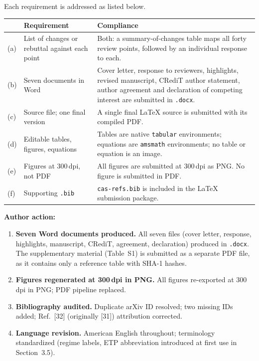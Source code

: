 \documentclass[11pt,a4paper]{article}
\newcommand{\arhead}[1]{\medskip\noindent\textbf{#1}\par\smallskip}
\begin{document}
Each requirement is addressed as listed below.

\renewcommand{\arraystretch}{1.2}
\begin{tabular}{@{}L{0.5cm}L{6.0cm}L{7.6cm}@{}}
\toprule
{} & \textbf{Requirement} & \textbf{Compliance} \\
\midrule
(a) & List of changes or rebuttal against each point &
Both: a summary-of-changes table maps all forty review points, followed
by an individual response to each. \\
(b) & Seven documents in Word &
Cover letter, response to reviewers, highlights, revised manuscript,
CRediT author statement, author agreement and declaration of competing
interest are submitted in \texttt{.docx}. \\
(c) & Source file; one final version &
A single final \LaTeX{} source is submitted with its compiled PDF. \\
(d) & Editable tables, figures, equations &
Tables are native \texttt{tabular} environments; equations are
\texttt{amsmath} environments; no table or equation is an image. \\
(e) & Figures at 300\,dpi, not PDF &
All figures are submitted at 300\,dpi as PNG. No figure is
submitted in PDF. \\
(f) & Supporting \texttt{.bib} &
\texttt{cas-refs.bib} is included in the \LaTeX{} submission package. \\
\bottomrule
\end{tabular}

\arhead{Author action:}
\begin{enumerate}[leftmargin=1.4em,itemsep=0.3em]
\item \textbf{Seven Word documents produced.}
      All seven files (cover letter, response, highlights, manuscript,
      CRediT, agreement, declaration) produced in \texttt{.docx}.
      The supplementary material (Table~S1) is submitted as a separate
      PDF file, as it contains only a reference table with SHA-1 hashes.
\item \textbf{Figures regenerated at 300\,dpi in PNG.}
      All figures re-exported at 300\,dpi in PNG; PDF pipeline replaced.
\item \textbf{Bibliography audited.}
      Duplicate arXiv ID resolved; two missing IDs added; Ref.~[32] (originally [31])
      attribution corrected.
\item \textbf{Language revision.}
      American English throughout; terminology standardized (regime labels,
      ETP abbreviation introduced at first use in Section~3.5).
\end{enumerate}
\end{document}
